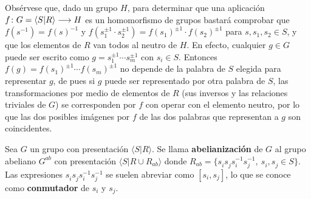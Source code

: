 \documentclass[GTSResumen.tex]{subfiles}
\begin{document}
\begin{nota}[Importante] Obsérvese que, dado un grupo $H$, para determinar que una aplicación $f\colon{G=\langle S|R\rangle}\longrightarrow{H}$ es un homomorfismo de grupos bastará comprobar que $f(s^{-1})=f(s)^{-1}$ y $f(s_1^{\pm 1}\cdot s_2^{\pm 1})=f(s_1)^{\pm 1}\cdot f(s_2)^{\pm 1}$ para $s,s_1,s_2\in S$, y que los elementos de $R$ van todos al neutro de $H$. En efecto, cualquier $g\in G$ puede ser escrito como $g=s_1^{\pm 1}\cdots s_m^{\pm 1}$ con $s_i\in S$. Entonces $f(g)=f(s_1)^{\pm 1}\cdots f(s_m)^{\pm 1}$ no depende de la palabra de $S$ elegida para representar $g$, de pues si $g$ puede ser representado por otra palabra de $S$, las transformaciones por medio de elementos de $R$ (sus inversos y las relaciones triviales de $G$) se corresponden por $f$ con operar con el elemento neutro, por lo que las dos posibles imágenes por $f$ de las dos palabras que representan a $g$ son coincidentes.
\end{nota}
\begin{comment}
\begin{ej} Algunos ejemplos de presentaciones son:
\begin{enumerate}
\item $\Z\begin{cases}
\langle a|\ \rangle  \text{ grupo libre de base }\{a\}\\
\langle a,b|ab^{-1}\rangle
\end{cases}\quad$ Son presentaciones equivalentes.
\item $\Z_n: \langle a| a^n\rangle$.
\item $\Z\times\Z: \langle a,b| aba^{-1}b^{-1}\rangle$. En este caso $R$ expresa la commutatividad, que no se considera relación trivial, ya que trabajamos con grupos no necesariamente abelianos. Nótese que además $R$ coincide con la identificación de las aristas en el polígono fundamental del toro.
\item $\Z\underbrace{\times\cdots\times}_{n\ veces}\Z: \langle a_1,\dots,a_n|a^{}_i a^{}_j a^{-1}_i a^{-1}_j\ 1\leq i\leq j\leq n\rangle$. Más generalmente, una presentación del grupo abeliano finitamente generado  $A=\Z^n\times\Z_{n_1}\times\cdots\times\Z_{n_k}$ es 
\begin{gather*}
\langle a_1,\dots,a_n,b_1,\dots,b_k|\ b^{n_s}_s,\ a^{}_ia^{}_ja^{-1}_ia^{-1}_j,\ a^{}_j b^{}_s a^{-1}_j b^{-1}_s,\ 1\leq i,j\leq n, 1\leq s\leq k\rangle.
\end{gather*}
\end{enumerate}
\end{ej}
\end{comment}
\begin{defi}
Sea $G$ un grupo con presentación $\langle S|R\rangle$. Se llama \textbf{abelianización} de $G$ al grupo abeliano $G^{ab}$ con presentación $\langle S| R\cup R_{ab}\rangle$ donde $R_{ab}=\{s^{}_i s^{}_j s^{-1}_i s^{-1}_j,\ s^{}_i, s^{}_j\in S \}$. Las expresiones $s^{}_i s^{}_j s^{-1}_i s^{-1}_j$ se suelen abreviar como $[s_i,s_j]$, lo que se conoce como \textbf{conmutador} de $s_i$ y $s_j$.
\end{defi}
\end{document}
